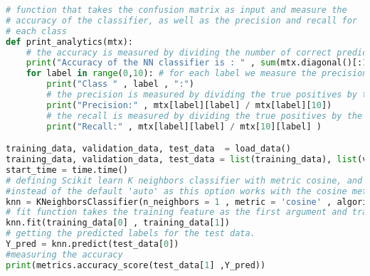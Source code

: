 \begin{lstlisting}[language=Python]
# function that takes the confusion matrix as input and measure the 
# accuracy of the classifier, as well as the precision and recall for 
# each class  
def print_analytics(mtx):  
    # the accuracy is measured by dividing the number of correct predictions by the total number of predictions
    print("Accuracy of the NN classifier is : " , sum(mtx.diagonal()[:10]) * 100/len(test_data) , "%"  ) 
    for label in range(0,10): # for each label we measure the precision and recall
        print("Class " , label , ":")
        # the precision is measured by dividing the true positives by the summation of true positives and false positives of this class
        print("Precision:" , mtx[label][label] / mtx[label][10])
        # the recall is measured by dividing the true positives by the summation of true positives and false negatives of this class  
        print("Recall:" , mtx[label][label] / mtx[10][label] )  

training_data, validation_data, test_data  = load_data()
training_data, validation_data, test_data = list(training_data), list(validation_data), list(test_data)
start_time = time.time() 
# defining Scikit learn K neighbors classifier with metric cosine, and number of neighbors to check as just 1 with algorithm brute 
#instead of the default 'auto' as this option works with the cosine metric
knn = KNeighborsClassifier(n_neighbors = 1 , metric = 'cosine' , algorithm='brute' )
# fit function takes the training feature as the first argument and training labels as second argument
knn.fit(training_data[0] , training_data[1])
# getting the predicted labels for the test data.
Y_pred = knn.predict(test_data[0])
#measuring the accuracy
print(metrics.accuracy_score(test_data[1] ,Y_pred))
\end{lstlisting}
